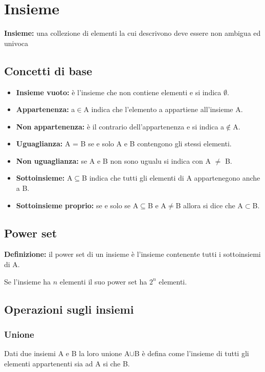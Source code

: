 \documentclass[../main.tex]{subfiles}
\begin{document}
    \section{Insieme}
    \textbf{Insieme:} una collezione di elementi la cui descrivono deve essere non ambigua ed univoca

    \subsection{Concetti di base}
    \begin{itemize}
        \item \textbf{Insieme vuoto:} è l'insieme che non contiene elementi e si indica $\emptyset$.
        \item \textbf{Appartenenza:} a$\in$A indica che l'elemento a appartiene all'insieme A.
        \item \textbf{Non appartenenza:} è il contrario dell'appartenenza e si indica a$\notin$A.
        \item \textbf{Uguaglianza:} A = B se e solo A e B contengono gli stessi elementi.
        \item \textbf{Non uguaglianza:} se A e B non sono ugualu si indica con A $\neq$ B.
        \item \textbf{Sottoinsieme:} A$\subseteq$B indica che tutti gli elementi di A appartenegono anche a B.
        \item \textbf{Sottoinsieme proprio:} se e solo se A$\subseteq$B e A$\neq$B allora si dice che A$\subset$B.
    \end{itemize}

    \subsection{Power set}
    \textbf{Definizione:} il power set di un insieme è l'insieme contenente tutti i sottoinsiemi di A.


    Se l'insieme ha $n$ elementi il suo power set ha $2^n$ elementi.

    \subsection{Operazioni sugli insiemi}
    \subsubsection{Unione}
    Dati due insiemi A e B la loro unione A$\cup$B è defina come l'insieme di tutti gli elementi appartenenti sia ad A si che B.
\end{document}
